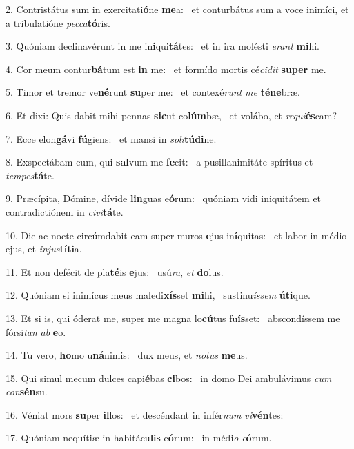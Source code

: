 2. Contristátus sum in exercitati\textbf{ó}ne \textbf{me}a: \ast\  et conturbátus sum a voce inimíci, et a tribulatióne \textit{pec}\textit{ca}\textbf{tó}ris.\

3. Quóniam declinavérunt in me in\textbf{i}qui\textbf{tá}tes: \ast\  et in ira molésti \textit{e}\textit{rant} \textbf{mi}hi.\

4. Cor meum contur\textbf{bá}tum est \textbf{in} me: \ast\  et formído mortis cé\textit{ci}\textit{dit} \textbf{su}\textbf{per} me.\

5. Timor et tremor ve\textbf{né}runt \textbf{su}per me: \ast\  et contexé\textit{runt} \textit{me} \textbf{té}\textbf{ne}bræ.\

6. Et dixi: Quis dabit mihi pennas \textbf{sic}ut co\textbf{lúm}bæ, \ast\  et volábo, et \textit{re}\textit{qui}\textbf{és}cam?\

7. Ecce elon\textbf{gá}vi \textbf{fú}giens: \ast\  et mansi in \textit{so}\textit{li}\textbf{tú}\textbf{di}ne.\

8. Exspectábam eum, qui \textbf{sal}vum me \textbf{fe}cit: \ast\  a pusillanimitáte spíritus et \textit{tem}\textit{pes}\textbf{tá}te.\

9. Præcípita, Dómine, dívide \textbf{lin}guas e\textbf{ó}rum: \ast\  quóniam vidi iniquitátem et contradictiónem in \textit{ci}\textit{vi}\textbf{tá}te.\

10. Die ac nocte circúmdabit eam super muros \textbf{e}jus in\textbf{í}quitas: \ast\  et labor in médio ejus, et \textit{in}\textit{jus}\textbf{tí}\textbf{ti}a.\

11. Et non defécit de pla\textbf{té}is \textbf{e}jus: \ast\  usú\textit{ra}, \textit{et} \textbf{do}lus.\

12. Quóniam si inimícus meus maledi\textbf{xís}set \textbf{mi}hi, \ast\  sustinu\textit{ís}\textit{sem} \textbf{ú}\textbf{ti}que.\

13. Et si is, qui óderat me, super me magna lo\textbf{cú}tus fu\textbf{ís}set: \ast\  abscondíssem me fórsi\textit{tan} \textit{ab} \textbf{e}o.\

14. Tu vero, \textbf{ho}mo u\textbf{ná}nimis: \ast\  dux meus, et \textit{no}\textit{tus} \textbf{me}us.\

15. Qui simul mecum dulces capi\textbf{é}bas \textbf{ci}bos: \ast\  in domo Dei ambulávimus \textit{cum} \textit{con}\textbf{sén}su.\

16. Véniat mors \textbf{su}per \textbf{il}los: \ast\  et descéndant in infér\textit{num} \textit{vi}\textbf{vén}tes:\

17. Quóniam nequítiæ in habitácu\textbf{lis} e\textbf{ó}rum: \ast\  in médi\textit{o} \textit{e}\textbf{ó}rum.\

